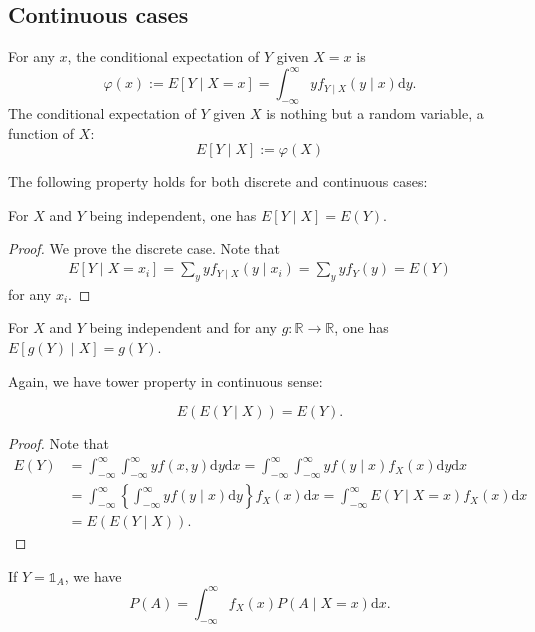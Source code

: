\documentclass[11pt,singlecolumn, openany, citestyle=authoryear]{elegantbook}
\begin{document}
\begin{CJK}{UTF8}{gbsn}
\subsection{Continuous cases}
\begin{definition}
    For any $x$, the conditional expectation of $Y$ given $X=x$ is 
    \begin{equation}
        \varphi(x):=E[Y\mid X= x]=\int_{-\infty}^\infty y f_{Y\mid X}(y\mid x)\mathrm{d}y.
    \end{equation}
    The conditional expectation of $Y$ given $X$ is nothing but a random variable,
    a function of $X$:
    \begin{equation}
        E[Y\mid X]:= \varphi(X)
    \end{equation}
\end{definition}
The following property holds for both discrete and continuous cases:
\begin{proposition}
    For $X$ and $Y$ being independent, one has $E[Y\mid X]=E(Y)$.
\end{proposition}
\begin{proof}
    We prove the discrete case.
    Note that 
    \begin{align*}
        E[Y\mid X=x_i]=\sum_{y}y f_{Y\mid X}(y\mid x_i)= \sum_{y} yf_Y(y) = E(Y)
    \end{align*}
    for any $x_i$.
\end{proof}
\begin{lemma}
    For $X$ and $Y$ being independent and for any $g:\mathbb{R}\to \mathbb{R}$,
    one has $E[g(Y)\mid X]=g(Y)$.
\end{lemma}

Again, we have tower property in continuous sense:
\begin{proposition}
    $$
    E(E(Y\mid X))=E(Y).
    $$
\end{proposition}
\begin{proof}
    Note that 
    \begin{align*}
        E(Y)&= \int_{-\infty}^\infty \int_{-\infty}^\infty yf(x,y)\mathrm{d}y\mathrm{d}x
        =\int_{-\infty}^\infty \int_{-\infty}^\infty yf(y\mid x) f_X(x)\mathrm{d}y\mathrm{d}x\\
        &= \int_{-\infty}^\infty \left\{\int_{-\infty}^\infty yf(y\mid x)\mathrm{d}y\right\}
        f_X(x)\mathrm{d}x=
        \int_{-\infty}^\infty E(Y\mid X=x)
        f_X(x)\mathrm{d}x\\
        &= E(E(Y\mid X)).
    \end{align*}
\end{proof}
\begin{remark}
    If $Y=\mathds{1}_A$, we have 
    $$
    P(A)=\int_{-\infty}^\infty f_X(x)P(A\mid X=x)\mathrm{d}x.
    $$
\end{remark}


\end{CJK}
\end{document}
